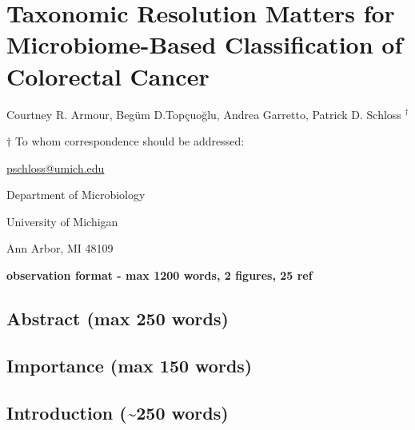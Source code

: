 \documentclass[
]{article}
\author{}
\date{\vspace{-2.5em}}
\begin{document}
\hypertarget{taxonomic-resolution-matters-for-microbiome-based-classification-of-colorectal-cancer}{%
\section{Taxonomic Resolution Matters for Microbiome-Based
Classification of Colorectal
Cancer}\label{taxonomic-resolution-matters-for-microbiome-based-classification-of-colorectal-cancer}}

\vspace{10mm}

Courtney R. Armour, Begüm D.Topçuoğlu, Andrea Garretto, Patrick D.
Schloss \({^\dagger}\)

\vspace{20mm}

\({\dagger}\) To whom correspondence should be addressed:

\href{mailto:pschloss@umich.edu}{pschloss@umich.edu}

Department of Microbiology

University of Michigan

Ann Arbor, MI 48109

\vspace{20mm}

\textbf{observation format - max 1200 words, 2 figures, 25 ref}

\newpage

\hypertarget{abstract-max-250-words}{%
\subsection{Abstract (max 250 words)}\label{abstract-max-250-words}}

\hypertarget{importance-max-150-words}{%
\subsection{Importance (max 150 words)}\label{importance-max-150-words}}

\newpage

\hypertarget{introduction-250-words}{%
\subsection{Introduction (\textasciitilde250
words)}\label{introduction-250-words}}
\end{document}
